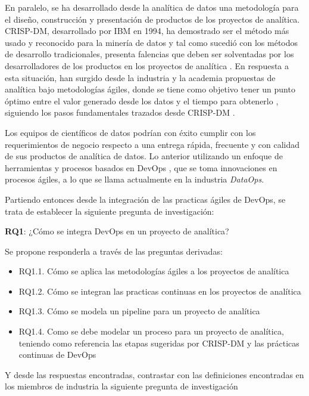 \documentclass[review]{elsarticle}
\begin{document}
En paralelo, se ha desarrollado desde la analítica de datos una metodología para el diseño, construcción y presentación de productos de los proyectos de analítica. CRISP-DM, desarrollado por IBM en 1994, ha demostrado ser el método más usado y reconocido para la minería de datos \cite{Piatetsky2014} y tal como sucedió con los métodos de desarrollo tradicionales, presenta falencias que deben ser solventadas por los desarrolladores de los productos en los proyectos de analítica \cite{Taylor2017}. En respuesta a esta situación, han surgido desde la industria y la academia propuestas de analítica bajo metodologías ágiles, donde se tiene como objetivo tener un punto óptimo entre el valor generado desde los datos y el tiempo para obtenerlo \cite{Grady2017}, siguiendo los pasos fundamentales trazados desde CRISP-DM \cite{Chapman2000}.

Los equipos de científicos de datos podrían con éxito cumplir con los requerimientos de negocio respecto a una entrega rápida, frecuente y con calidad de sus productos de analítica de datos. Lo anterior utilizando un enfoque de herramientas y procesos basados en DevOps \cite{Bergh2017}⁠, que se toma innovaciones en procesos ágiles, a lo que se llama actualmente en la industria \textit{DataOps}.

Partiendo entonces desde la integración de las practicas ágiles de DevOps, se trata de establecer la siguiente pregunta de investigación:

\textbf{RQ1}: ¿Cómo se integra DevOps en un proyecto de analítica?

Se propone responderla a través de las preguntas derivadas:

\begin{itemize}
\item RQ1.1. Cómo se aplica las metodologías ágiles a los proyectos de analítica
\item RQ1.2. Cómo se integran las practicas continuas en los proyectos de analítica
\item RQ1.3. Cómo se modela un pipeline para un proyecto de analítica
\item RQ1.4. Como se debe modelar un proceso para un proyecto de analítica, teniendo como referencia las etapas sugeridas por CRISP-DM y las prácticas continuas de DevOps
\end{itemize}

Y desde las respuestas encontradas, contrastar con las definiciones encontradas en los miembros de industria la siguiente pregunta de investigación
\end{document}
